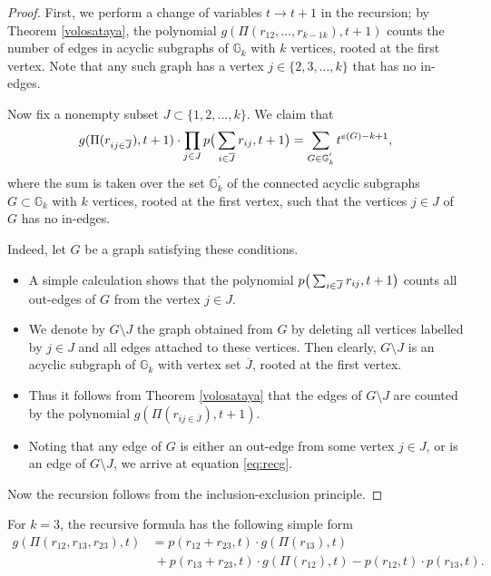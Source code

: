 \begin{proof}
First, we perform a change of variables $t\to t+1$ in the recursion; by Theorem \ref{volosataya}, the polynomial $g(\Pi(r_{12}, \ldots ,r_{k-1 k}), t+1)$ counts the number of edges in acyclic subgraphs of $\mathbb{G}_k$  with $k$ vertices, rooted at the first vertex. Note that any such graph has a vertex $j\in\{2,3, \ldots ,k\}$ that has no in-edges. 

Now fix a nonempty subset $J\subset\{1,2, \ldots ,k\}$. We claim that  
\begin{equation}\label{eq:recg}
g(\Pi(r_{ij\in \overline{J}}),t+1)\cdot\prod_{j\in J}p\big{(}\sum_{i\in\overline{J}}r_{ij},t+1\big{)} = \sum_{G\in\mathbb{G}^{'}_k} t^{e(G)-k+1},
\end{equation}
 where the sum is taken over the set $ \mathbb{G}^{'}_k $ of the connected acyclic subgraphs 
 $G\subset\mathbb{G}_k$  with $k$ vertices, rooted at the first vertex, such 
 that the vertices $j\in J$ of $G$ has no in-edges. 
 
 Indeed, let $G$ be a graph satisfying these conditions.
\begin{itemize}
\item A simple calculation shows that the polynomial $p\big{(}\sum_{i\in\overline{J}}r_{ij},t+1\big{)}$ counts  all out-edges of $G$ from the vertex $j\in J$.
\item We denote by $G\setminus J$ the graph obtained from $G$ by deleting all vertices labelled by $j\in J$ and all edges attached to these vertices. Then clearly, $G\setminus J$ is an acyclic subgraph of $\mathbb{G}_k$ with vertex set $\overline{J}$, rooted at the first vertex. 
\item Thus it follows from Theorem \ref{volosataya} that the edges of 
$G\setminus J$ are counted by the polynomial  $g(\Pi(r_{ij\in \overline{J}}),t+1)$.
\item Noting that any edge of $G$ is either an out-edge from some vertex $j\in J$, or is an edge of $G\setminus J$, we arrive at equation \eqref{eq:recg}. 
\end{itemize}
Now the recursion follows from the inclusion-exclusion principle.
\end{proof}
\begin{exam}
For $k=3$, the recursive formula has the following simple form
\begin{align*}
g(\Pi(r_{12},r_{13},r_{23}), t) &= p({r_{12}+r_{23},t})\cdot g(\Pi(r_{13}), t) \\
&\ + p{(r_{13}+r_{23}, t)}\cdot g(\Pi(r_{12}), t) - p{(r_{12},t)}\cdot p{(r_{13},t)}.
\end{align*}
\end{exam}

